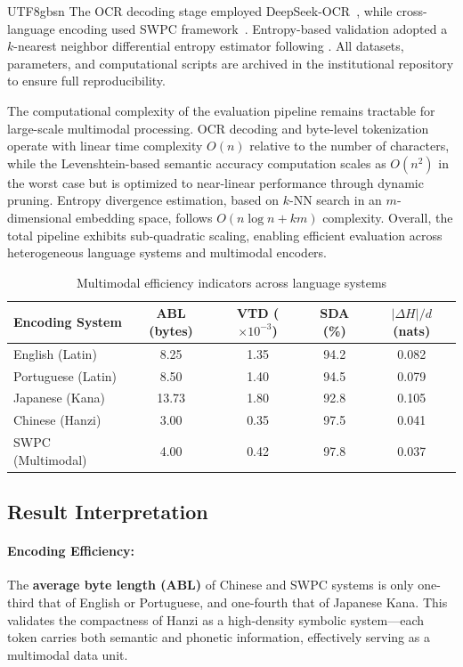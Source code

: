 \documentclass[conference]{IEEEtran}
\begin{document}
\begin{CJK*}{UTF8}{gbsn}
The OCR decoding stage employed DeepSeek-OCR~\cite{wei2025deepseek}, while cross-language encoding used SWPC  framework~\cite{weigang2024six}. Entropy-based validation adopted a $k$-nearest neighbor differential entropy estimator following \cite{belghazi2018mutual}. All datasets, parameters, and computational scripts are archived in the institutional repository to ensure full reproducibility.

The computational complexity of the evaluation pipeline remains tractable for large-scale multimodal processing. OCR decoding and byte-level tokenization operate with linear time complexity $O(n)$ relative to the number of characters, while the Levenshtein-based semantic accuracy computation scales as $O(n^2)$ in the worst case but is optimized to near-linear performance through dynamic pruning. Entropy divergence estimation, based on $k$-NN search in an $m$-dimensional embedding space, follows $O(n \log n + km)$ complexity. Overall, the total pipeline exhibits sub-quadratic scaling, enabling efficient evaluation across heterogeneous language systems and multimodal encoders.

\begin{table}[htbp]
\centering
\caption{Multimodal efficiency indicators across language systems}
\label{tab:efficiency_metrics}
\footnotesize
\renewcommand{\arraystretch}{1.2}
\begin{tabular}{|l|c|c|c|c|}
\hline
\toprule
\textbf{Encoding System} & \textbf{ABL (bytes)} & \textbf{VTD ($\times10^{-3}$)} & \textbf{SDA (\%)} & \textbf{$|\Delta H|/d$ (nats)} \\
\midrule
\hline
English (Latin) & 8.25 & 1.35 & 94.2 & 0.082 \\
\hline
Portuguese (Latin) & 8.50 & 1.40 & 94.5 & 0.079 \\
\hline
Japanese (Kana) & 13.73 & 1.80 & 92.8 & 0.105 \\
\hline
Chinese (Hanzi) & 3.00 & 0.35 & 97.5 & 0.041 \\
\hline
SWPC (Multimodal) & 4.00 & 0.42 & 97.8 & 0.037 \\
\hline
\bottomrule
\end{tabular}
\end{table}

\subsection{Result Interpretation}

\paragraph{Encoding Efficiency:}  
The \textbf{average byte length (ABL)} of Chinese and SWPC systems is only one-third that of English or Portuguese, and one-fourth that of Japanese Kana.  
This validates the compactness of Hanzi as a high-density symbolic system—each token carries both semantic and phonetic information, effectively serving as a multimodal data unit.


\end{CJK*}
\end{document}
